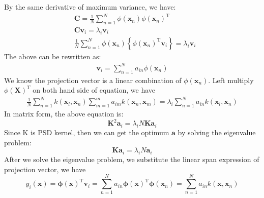 \documentclass{article}
\begin{document}
By the same derivative of maximum variance, we have:
\begin{align*}
&\mathbf{C}=\frac{1}{N} \sum_{n=1}^{N} \phi\left(\mathbf{x}_{n}\right) \phi\left(\mathbf{x}_{n}\right)^{\mathrm{T}}\\
&\mathbf{C} \mathbf{v}_{i}=\lambda_{i} \mathbf{v}_{i}\\
&\frac{1}{N} \sum_{n=1}^{N} \phi\left(\mathbf{x}_{n}\right)\left\{\phi\left(\mathbf{x}_{n}\right)^{\mathrm{T}} \mathbf{v}_{i}\right\}=\lambda_{i} \mathbf{v}_{i}
\end{align*}
The above can be rewritten as:
\begin{align*}
\mathbf{v}_{i}=\sum_{n=1}^{N} a_{i n} \phi\left(\mathbf{x}_{n}\right)
\end{align*}
We know the projection vector is a linear combination of $\phi(\mathbf{x}_n)$. Left multiply $\phi(\mathbf{X})^{T}$ on both hand side of equation, we have 
\begin{align*}
\frac{1}{N} \sum_{n=1}^{N} k\left(\mathbf{x}_{l}, \mathbf{x}_{n}\right) \sum_{m=1}^{m} a_{i m} k\left(\mathbf{x}_{n}, \mathbf{x}_{m}\right)=\lambda_{i} \sum_{n=1}^{N} a_{i n} k\left(\mathbf{x}_{l}, \mathbf{x}_{n}\right)
\end{align*}
In matrix form, the above equation is:
\begin{equation}
\mathbf{K}^{2} \mathbf{a}_{i}=\lambda_{i} N \mathbf{K} \mathbf{a}_{i}
\end{equation}
Since K is PSD kernel, then we can get the optimum $\mathbf{a}$ by solving the eigenvalue problem:
\begin{equation}
\mathbf{K} \mathbf{a}_{i}=\lambda_{i} N \mathbf{a}_{i}
\end{equation}
After we solve the eigenvalue problem, we substitute the linear span expression of projection vector, we have
\begin{equation}
y_{i}(\mathbf{x})=\boldsymbol{\phi}(\mathbf{x})^{\mathrm{T}} \mathbf{v}_{i}=\sum_{n=1}^{N} a_{i n} \boldsymbol{\phi}(\mathbf{x})^{\mathrm{T}} \boldsymbol{\phi}\left(\mathbf{x}_{n}\right)=\sum_{n=1}^{N} a_{i n} k\left(\mathbf{x}, \mathbf{x}_{n}\right)
\end{equation}
\end{document}
